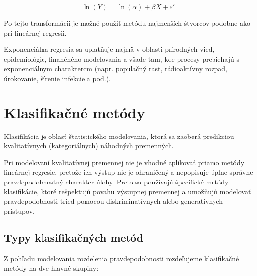 \begin{equation}
\ln(Y) = \ln(\alpha) + \beta X + \varepsilon'
\end{equation}

Po tejto transformácii je možné použiť metódu najmenších štvorcov podobne ako pri lineárnej regresii.

Exponenciálna regresia sa uplatňuje najmä v oblasti prírodných vied, epidemiológie, finančného modelovania a všade tam, kde procesy prebiehajú s exponenciálnym charakterom (napr. populačný rast, rádioaktívny rozpad, úrokovanie, šírenie infekcie a pod.).

\section{Klasifikačné metódy}\label{sec:classification}

Klasifikácia je oblasť štatistického modelovania, ktorá sa zaoberá predikciou kvalitatívnych (kategoriálnych) náhodných premenných. 

Pri modelovaní kvalitatívnej premennej nie je vhodné aplikovať priamo metódy lineárnej regresie, pretože ich výstup nie je ohraničený a nepopisuje úplne správne pravdepodobnostný charakter úlohy. Preto sa používajú špecifické metódy klasifikácie, ktoré rešpektujú povahu výstupnej premennej a umožňujú modelovať pravdepodobnosti tried pomocou diskriminatívnych alebo generatívnych prístupov.

\subsection*{Typy klasifikačných metód}

Z pohľadu modelovania rozdelenia pravdepodobnosti rozdeľujeme klasifikačné metódy na dve hlavné skupiny:

